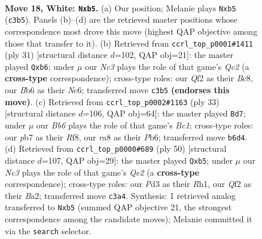 \documentclass[11pt]{article}
\begin{document}
\begin{figure}[p]\centering
\begin{subfigure}{0.46\textwidth}\centering
\resizebox{\linewidth}{!}{%
\newchessgame
\chessboard[
  setfen={r3kb1r/1p1bpp1n/1B1p2p1/1q5p/4P3/1PNP1P2/P4QPP/2K1R2R w kq - 0 18},
  showmover=false,
  pgfstyle=straightmove, color=movearrow, markmove={c3-b5}
]}
\caption{}
\end{subfigure}\hfill
\begin{subfigure}{0.46\textwidth}\centering
\resizebox{\linewidth}{!}{%
\newchessgame
\chessboard[
  setfen={r1b1r1k1/1pq2pp1/pQn2n1p/4p3/2P5/P4NP1/4PPBP/1RBR2K1 b - - 1 16},
  showmover=false,
  pgfstyle=straightmove, color=movearrow, markmove={c7-b6}
]}
\caption{}
\end{subfigure}
\\[4pt]
\begin{subfigure}{0.46\textwidth}\centering
\resizebox{\linewidth}{!}{%
\newchessgame
\chessboard[
  setfen={r1bq1rk1/p5pp/1pR2p2/3p4/3Pn3/3QB1P1/P3PPBP/R5K1 b - - 0 17},
  showmover=false,
  pgfstyle=straightmove, color=movearrow, markmove={c8-d7}
]}
\caption{}
\end{subfigure}\hfill
\begin{subfigure}{0.46\textwidth}\centering
\resizebox{\linewidth}{!}{%
\newchessgame
\chessboard[
  setfen={2r1k2r/1p1b1pp1/p2p3p/1q1Np1b1/4P1P1/P1P3P1/BP2Q2P/R3K2R w KQk - 1 26},
  showmover=false,
  pgfstyle=straightmove, color=movearrow, markmove={e2-b5}
]}
\caption{}
\end{subfigure}
\caption{\textbf{Move 18, White: \texttt{Nxb5}.} (a) Our position; Melanie plays \texttt{Nxb5} (\texttt{c3b5}). Panels (b)--(d) are the retrieved master positions whose correspondence most drove this move (highest QAP objective among those that transfer to it). (b) Retrieved from \texttt{ccrl\_top\_p0001\#1411} (ply 31) [structural distance $d$=102, QAP obj=21]: the master played \texttt{Qxb6}; under $\mu$ our \emph{Nc3} plays the role of that game's \emph{Qc2} (a \textbf{cross-type} correspondence); cross-type roles: our \emph{Q}f2 as their \emph{B}c8, our \emph{B}b6 as their \emph{N}c6; transferred move \texttt{c3b5} \textbf{(endorses this move)}. (c) Retrieved from \texttt{ccrl\_top\_p0002\#1163} (ply 33) [structural distance $d$=106, QAP obj=64]: the master played \texttt{Bd7}; under $\mu$ our \emph{Bb6} plays the role of that game's \emph{Bc1}; cross-type roles: our \emph{p}b7 as their \emph{R}f8, our \emph{r}a8 as their \emph{P}b6; transferred move \texttt{b6d4}. (d) Retrieved from \texttt{ccrl\_top\_p0000\#689} (ply 50) [structural distance $d$=107, QAP obj=29]: the master played \texttt{Qxb5}; under $\mu$ our \emph{Nc3} plays the role of that game's \emph{Qe2} (a \textbf{cross-type} correspondence); cross-type roles: our \emph{P}d3 as their \emph{R}h1, our \emph{Q}f2 as their \emph{B}a2; transferred move \texttt{c3a4}. Synthesis: 1 retrieved analog transferred to \texttt{Nxb5} (summed QAP objective 21, the strongest correspondence among the candidate moves); Melanie committed it via the \texttt{search} selector.}
\label{fig:thought-m34}
\end{figure}
\end{document}
